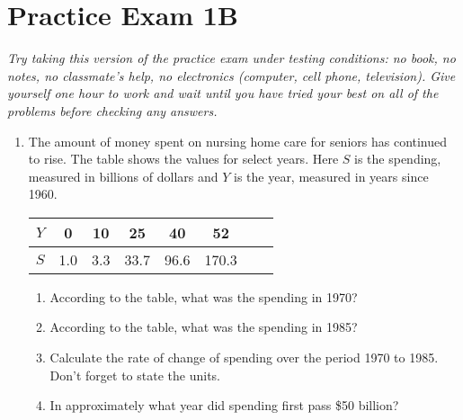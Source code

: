 
\section*{Practice Exam 1B}  

\emph{Try taking this version of the practice exam under testing conditions:  no book, no notes, no classmate's help, no electronics (computer, cell phone, television). Give yourself one hour to work and wait until you have tried your best on all of the problems before checking any answers.}

\noindent \hrulefill

\begin{enumerate}

\item The amount of money spent on nursing home care for seniors has continued to rise.  The table shows the values for select years.  Here $S$ is the spending, measured in billions of dollars and $Y$ is the year, measured in years since 1960.

\begin{center}
\begin{tabular} {|c ||c |c |c |c |c |c |c |} \hline
$Y$ & 0 & 10 & 25 & 40 & 52 \\ \hline
$S$ & 1.0 & 3.3 & 33.7 & 96.6 & 170.3 \\ \hline
\end{tabular}
\end{center}

\begin{enumerate}
\item According to the table, what was the spending in 1970?  \vfill
\item According to the table, what was the spending in 1985?  \vfill
\item Calculate the rate of change of spending over the period 1970 to 1985.  Don't forget to state the units. \vfill \vfill
\item In approximately what year did spending first pass \$50 billion? \vfill
\end{enumerate}

\newpage


\end{enumerate}
